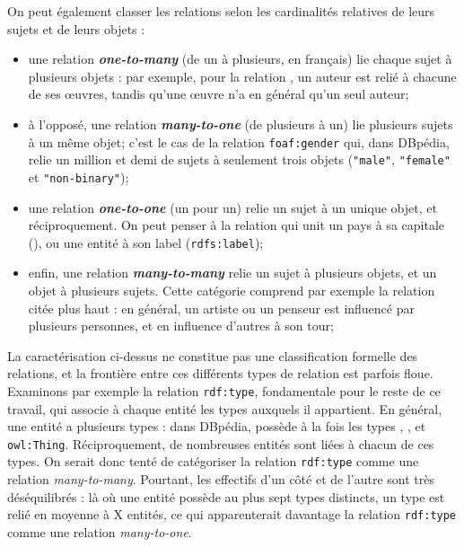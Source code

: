 On peut également classer les relations selon les cardinalités relatives de leurs sujets et de leurs objets :
\begin{itemize}
    \item une relation \textbf{\textit{one-to-many}} (de un à plusieurs, en français) lie chaque sujet à plusieurs objets : par exemple, pour la relation , un auteur est relié à chacune de ses œuvres, tandis qu'une œuvre n'a en général qu'un seul auteur;
    \item à l'opposé, une relation \textbf{\textit{many-to-one}} (de plusieurs à un) lie plusieurs sujets à un même objet; c'est le cas de la relation \texttt{foaf:gender} qui, dans DBpédia, relie un million et demi de sujets à seulement trois objets (\texttt{"male"}, \texttt{"female"} et \texttt{"non-binary"});
    \item une relation \textbf{\textit{one-to-one}} (un pour un) relie un sujet à un unique objet, et réciproquement. On peut penser à la relation qui unit un pays à sa capitale (), ou une entité à son label (\texttt{rdfs:label});
    \item enfin, une relation \textbf{\textit{many-to-many}} relie un sujet à plusieurs objets, et un objet à plusieurs sujets. Cette catégorie comprend par exemple la relation  citée plus haut : en général, un artiste ou un penseur est influencé par plusieurs personnes, et en influence d'autres à son tour;
\end{itemize}
La caractérisation ci-dessus ne constitue pas une classification formelle des relations, et la frontière entre ces différents types de relation est parfois floue. Examinons par exemple la relation \texttt{rdf:type}, fondamentale pour le reste de ce travail, qui associe à chaque entité les types auxquels il appartient. En général, une entité a plusieurs types : dans DBpédia,  possède à la fois les types , ,  et \texttt{owl:Thing}. Réciproquement, de nombreuses entités sont liées à chacun de ces types. On serait donc tenté de catégoriser la relation \texttt{rdf:type} comme une relation \textit{many-to-many}. Pourtant, les effectifs d'un côté et de l'autre sont très déséquilibrés : là où une entité possède au plus sept types distincts, un type est relié en moyenne à X entités, ce qui apparenterait davantage la relation \texttt{rdf:type} comme une relation \textit{many-to-one}. %

